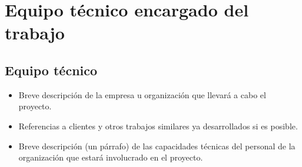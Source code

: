 
\chapter{Equipo t\'ecnico encargado del trabajo} %

\label{Chapter5} %


\section{Equipo t\'ecnico}

\begin{itemize}
	\item Breve descripción de la empresa u organización que llevará a cabo el proyecto.
	\item Referencias a clientes y otros trabajos similares ya desarrollados si es posible.
	\item Breve descripción (un párrafo) de las capacidades técnicas del personal de la organización que estará involucrado en el proyecto.
\end{itemize}
